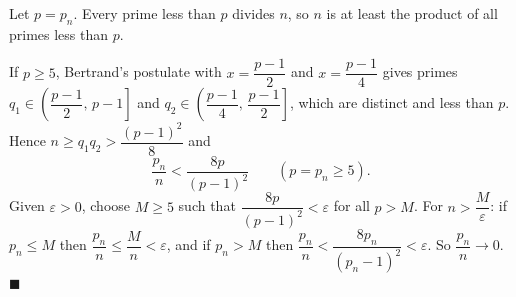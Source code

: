 Let $p=p_n$. Every prime less than $p$ divides $n$, so $n$ is at least the product of all primes less than $p$.

If $p\ge5$, Bertrand's postulate with $x=\dfrac{p-1}{2}$ and $x=\dfrac{p-1}{4}$ gives primes $q_1\in\left(\dfrac{p-1}2,\,p-1\right]$ and $q_2\in\left(\dfrac{p-1}4,\,\dfrac{p-1}2\right]$, which are distinct and less than $p$. Hence $n\ge q_1q_2>\dfrac{(p-1)^2}{8}$ and
\[\dfrac{p_n}{n}<\dfrac{8p}{(p-1)^2}\qquad(p=p_n\ge5).\]
Given $\varepsilon>0$, choose $M\ge5$ such that $\dfrac{8p}{(p-1)^2}<\varepsilon$ for all $p>M$. For $n>\dfrac{M}{\varepsilon}$: if $p_n\le M$ then $\dfrac{p_n}{n}\le\dfrac Mn<\varepsilon$, and if $p_n>M$ then $\dfrac{p_n}{n}<\dfrac{8p_n}{(p_n-1)^2}<\varepsilon$. So $\dfrac{p_n}{n}\to0$. $\blacksquare$

